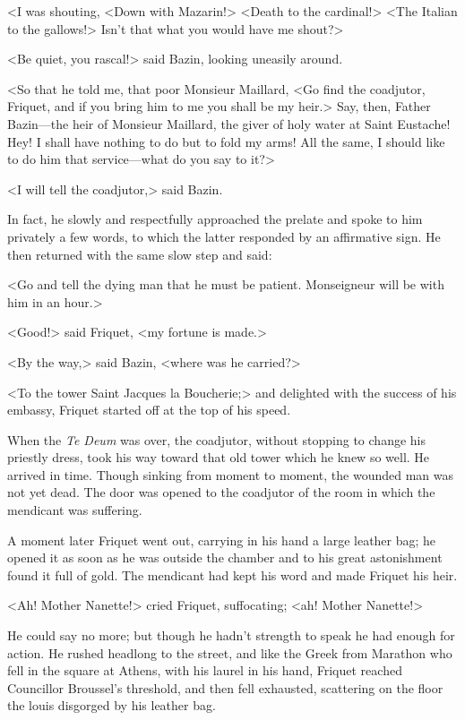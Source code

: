 <I was shouting, <Down with Mazarin!> <Death to the cardinal!> <The Italian to the gallows!> Isn't that what you would have me shout?>

<Be quiet, you rascal!> said Bazin, looking uneasily around.

<So that he told me, that poor Monsieur Maillard, <Go find the coadjutor, Friquet, and if you bring him to me you shall be my heir.> Say, then, Father Bazin—the heir of Monsieur Maillard, the giver of holy water at Saint Eustache! Hey! I shall have nothing to do but to fold my arms! All the same, I should like to do him that service—what do you say to it?>

<I will tell the coadjutor,> said Bazin.

In fact, he slowly and respectfully approached the prelate and spoke to him privately a few words, to which the latter responded by an affirmative sign. He then returned with the same slow step and said:

<Go and tell the dying man that he must be patient. Monseigneur will be with him in an hour.>

<Good!> said Friquet, <my fortune is made.>

<By the way,> said Bazin, <where was he carried?>

<To the tower Saint Jacques la Boucherie;> and delighted with the success of his embassy, Friquet started off at the top of his speed.

When the \textit{Te Deum} was over, the coadjutor, without stopping to change his priestly dress, took his way toward that old tower which he knew so well. He arrived in time. Though sinking from moment to moment, the wounded man was not yet dead. The door was opened to the coadjutor of the room in which the mendicant was suffering.

A moment later Friquet went out, carrying in his hand a large leather bag; he opened it as soon as he was outside the chamber and to his great astonishment found it full of gold. The mendicant had kept his word and made Friquet his heir.

<Ah! Mother Nanette!> cried Friquet, suffocating; <ah! Mother Nanette!>

He could say no more; but though he hadn't strength to speak he had enough for action. He rushed headlong to the street, and like the Greek from Marathon who fell in the square at Athens, with his laurel in his hand, Friquet reached Councillor Broussel's threshold, and then fell exhausted, scattering on the floor the louis disgorged by his leather bag.

